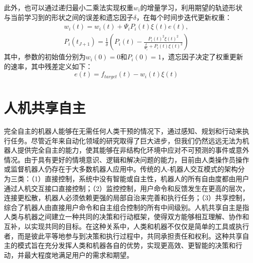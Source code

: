 此外，也可以通过递归最小二乘法实现权重$w_i$的增量学习，利用期望的轨迹形状与当前学习到的形状之间的误差和遗忘因子$\delta $，在每个时间步迭代更新权重：
\begin{equation}
    \begin{gathered}
    w_i(t)=w_i(t)+\Psi_i P_i\left(t\right) \xi(t) e\left(t\right), \\
    P_i\left(t_{J+1}\right)=\frac{1}{\delta}\left(P_i\left(t\right)-\frac{P_i\left(t\right)^2 \xi(t)^2}{\frac{\delta}{\Psi_i}+P_i\left(t\right) \xi(t)^2}\right)
    \end{gathered}
    \label{eq:2-17}
\end{equation}
其中，参数的初始值分别为$w_i(0)=0$和$P_i(0)=1$，遗忘因子决定了权重更新的速率，其中残差定义如下：
\begin{equation}
    e\left(t\right)=f_{target}\left(t\right)-w_i\left(t\right) \xi(t)
    \label{eq:2-18}
\end{equation}

\section{人机共享自主}
完全自主的机器人能够在无需任何人类干预的情况下，通过感知、规划和行动来执行任务。尽管近年来自动化领域的研究取得了巨大进步，但我们仍然远远无法为机器人提供完全自主的能力，使其能够在非结构化环境中应对不可预测的事件或意外情况。由于具有更好的情境意识、逻辑和解决问题的能力，目前由人类操作员操作或监督机器人仍存在于大多数机器人应用中。传统的人-机器人交互模式的架构分为三类：（1）直接控制，系统中没有智能或自主性，机器人的所有自由度都由用户通过人机交互接口直接控制；（2）监控控制，用户命令和反馈发生在更高的层次，连接更松散，机器人必须依赖更强的局部自治来完善和执行任务；（3）共享控制，综合了机器人由直接用户命令和自主组合控制的所有中间级别。人机共享自主是指人类与机器之间建立一种共同的决策和行动框架，使得双方能够相互理解、协作和互补，以实现共同的目标。在这种关系中，人类和机器不仅仅是简单的工具或执行者，而是彼此平等地参与到决策和执行过程中，共同承担责任和权利。这种共享自主的模式旨在充分发挥人类和机器各自的优势，实现更高效、更智能的决策和行动，并最大程度地满足用户的需求和期望\cite{selvaggioAutonomyPhysicalHumanRobot2021a}。

